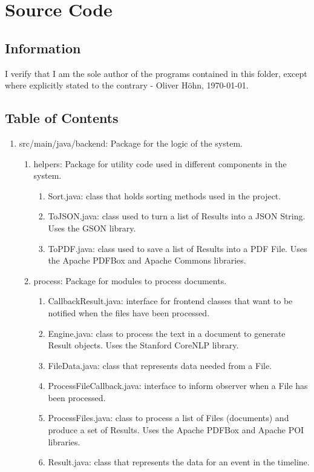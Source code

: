 \chapter{Source Code}
\section{Information}
I verify that I am the sole author of the programs contained in this folder, except where explicitly stated to the contrary - {Oliver H\"ohn}, \today.
\section{Table of Contents}
\begin{enumerate}
	\item src/main/java/backend: Package for the logic of the system.
		\begin{enumerate}
			\item helpers: Package for utility code used in different components in the system.
			\begin{enumerate}
				\item Sort.java: class that holds sorting methods used in the project.
				\item ToJSON.java: class used to turn a list of Results into a JSON String. Uses the GSON library.
				\item ToPDF.java: class used to save a list of Results into a PDF File. Uses the Apache PDFBox and Apache Commons libraries.
			\end{enumerate}
			\item process: Package for modules to process documents.
			\begin{enumerate}
				\item CallbackResult.java: interface for frontend classes that want to be notified when the files have been processed.
				\item Engine.java: class to process the text in a document to generate Result objects. Uses the Stanford CoreNLP library.
				\item FileData.java: class that represents data needed from a File.
				\item ProcessFileCallback.java: interface to inform observer when a File has been processed.
				\item ProcessFiles.java: class to process a list of Files (documents) and produce a set of Results. Uses the Apache PDFBox and Apache POI libraries.
				\item Result.java: class that represents the data for an event in the timeline.

\end{enumerate}
\end{enumerate}
\end{enumerate}
